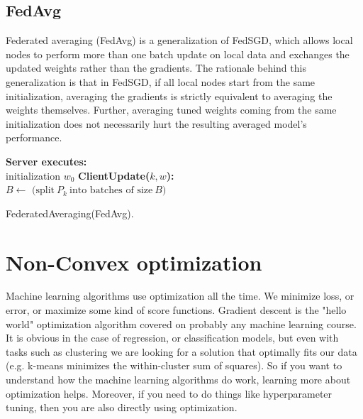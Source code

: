 \documentclass{article}
\theoremstyle{theorem}
\theoremstyle{definition}
\begin{document}
	\subsection{FedAvg}
Federated averaging (FedAvg) is a generalization of FedSGD, which allows local nodes to perform more than one batch update on local data and exchanges the updated weights rather than the gradients. The rationale behind this generalization is that in FedSGD, if all local nodes start from the same initialization, averaging the gradients is strictly equivalent to averaging the weights themselves. Further, averaging tuned weights coming from the same initialization does not necessarily hurt the resulting averaged model's performance.	
	\begin{algorithm}[H]
		\SetAlgoLined
		\textbf{Server executes:} \\
		initialization $w_0$ \;
	\textbf{ClientUpdate($k,w$):}\\
	$B \leftarrow \text{ (split} \ P_k	\ \text{into batches of size} \ B )$\\
		\caption{FederatedAveraging(FedAvg).}
	\end{algorithm}

	\section{Non-Convex optimization}
Machine learning algorithms use optimization all the time. We minimize loss, or error, or maximize some kind of score functions. Gradient descent is the "hello world" optimization algorithm covered on probably any machine learning course. It is obvious in the case of regression, or classification models, but even with tasks such as clustering we are looking for a solution that optimally fits our data (e.g. k-means minimizes the within-cluster sum of squares). So if you want to understand how the machine learning algorithms do work, learning more about optimization helps. Moreover, if you need to do things like hyperparameter tuning, then you are also directly using optimization.
\end{document}
